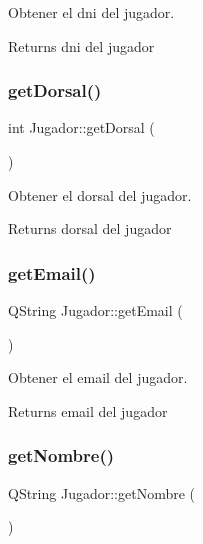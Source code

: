 Obtener el dni del jugador. 

\begin{DoxyReturn}{Returns}
dni del jugador 
\end{DoxyReturn}
\mbox{\label{classJugador_a7f67a27c34f24e618cdbfbebf29b8704}} 
\subsubsection{\texorpdfstring{get\+Dorsal()}{getDorsal()}}
{\footnotesize\ttfamily int Jugador\+::get\+Dorsal (\begin{DoxyParamCaption}{ }\end{DoxyParamCaption})}



Obtener el dorsal del jugador. 

\begin{DoxyReturn}{Returns}
dorsal del jugador 
\end{DoxyReturn}
\mbox{\label{classJugador_ac70026da85dea7d05eaaf8df72c4e8eb}} 
\subsubsection{\texorpdfstring{get\+Email()}{getEmail()}}
{\footnotesize\ttfamily Q\+String Jugador\+::get\+Email (\begin{DoxyParamCaption}{ }\end{DoxyParamCaption})}



Obtener el email del jugador. 

\begin{DoxyReturn}{Returns}
email del jugador 
\end{DoxyReturn}
\mbox{\label{classJugador_a326995f44b24a9a5247144868f2ba359}} 
\subsubsection{\texorpdfstring{get\+Nombre()}{getNombre()}}
{\footnotesize\ttfamily Q\+String Jugador\+::get\+Nombre (\begin{DoxyParamCaption}{ }\end{DoxyParamCaption})}



